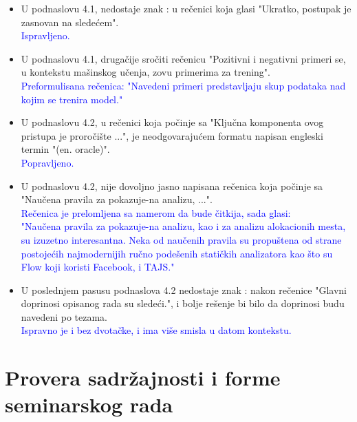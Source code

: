 \documentclass[a4paper]{report}
\newcommand{\odgovor}[1]{\textcolor{blue}{#1}}
\begin{document}
\begin{itemize}
	\item U podnaslovu 4.1, nedostaje znak : u rečenici koja glasi "Ukratko, postupak je zasnovan na sledećem".
	\\\odgovor{Ispravljeno.}

    \item U podnaslovu 4.1, drugačije sročiti rečenicu "Pozitivni i negativni primeri se, u kontekstu mašinskog učenja, zovu primerima za trening".
    \\\odgovor{Preformulisana rečenica:
    	"Navedeni primeri predstavljaju skup podataka nad kojim se trenira model."\space}

    \item U podnaslovu 4.2, u rečenici koja počinje sa "Ključna komponenta ovog pristupa je proročište ...", je neodgovarajućem formatu napisan engleski termin "(en. oracle)".
    \\\odgovor{Popravljeno.}

    \item U podnaslovu 4.2, nije dovoljno jasno napisana rečenica koja počinje sa "Naučena pravila za pokazuje-na analizu, ...".
    \\\odgovor{Rečenica je prelomljena sa namerom da bude čitkija, sada glasi:\\
    	"Naučena pravila za pokazuje-na analizu, kao i za
    	analizu alokacionih mesta, su izuzetno interesantna. Neka od naučenih pravila su propuštena od
    	strane postojećih najmodernijih ručno podešenih statičkih analizatora kao što
    	su Flow koji koristi Facebook, i TAJS."\space
    }

    \item U poslednjem pasusu podnaslova 4.2 nedostaje znak : nakon rečenice "Glavni doprinosi opisanog rada su sledeći.", i bolje rešenje bi bilo da doprinosi budu navedeni po tezama.
    \\\odgovor{Ispravno je i bez dvotačke, i ima više smisla u datom kontekstu.}
\end{itemize}


\section{Provera sadržajnosti i forme seminarskog rada}
\end{document}
